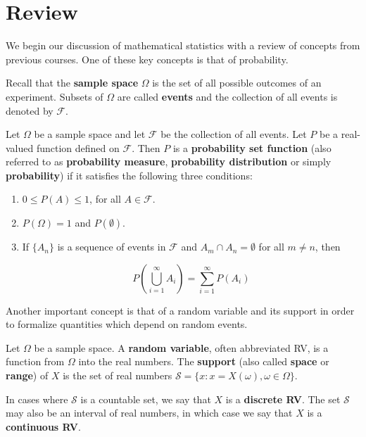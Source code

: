 \section{Review}

We begin our discussion of mathematical statistics with a review of concepts from previous courses. One of these key concepts is that of probability.

Recall that the \textbf{sample space} $\Omega$ is the set of all possible outcomes of an experiment. Subsets of $\Omega$ are called \textbf{events} and the collection of all events is denoted by $\mathcal F$.

\begin{definition}
	Let $\Omega$ be a sample space and let $\mathcal F$ be the collection of all events. Let $P$ be a real-valued function defined on $\mathcal F$. Then $P$ is a \textbf{probability set function} (also referred to as \textbf{probability measure}, \textbf{probability distribution} or simply \textbf{probability}) if it satisfies the following three conditions:
	\begin{enumerate}
		\item $0\leq P(A)\leq 1$, for all $A\in\mathcal F$.
		\item $P(\Omega)=1$ and $P(\emptyset)$.
		\item If $\{A_n\}$ is a sequence of events in $\mathcal F$ and $A_m\cap A_n=\emptyset$ for all $m\neq n$, then

		$$P\left(\bigcup_{i=1}^\infty A_i\right)=\sum_{i=1}^\infty P(A_i)$$
	\end{enumerate}
\end{definition}

Another important concept is that of a random variable and its support in order to formalize quantities which depend on random events.

\begin{definition}
	Let $\Omega$ be a sample space. A \textbf{random variable}, often abbreviated RV, is a function from $\Omega$ into the real numbers. The \textbf{support} (also called \textbf{space} or \textbf{range}) of $X$ is the set of real numbers $\mathcal S=\{x:x=X(\omega),\omega\in \Omega\}$.
\end{definition}

In cases where $\mathcal S$ is a countable set, we say that $X$ is a \textbf{discrete RV}. The set $\mathcal S$ may also be an interval of real numbers, in which case we say that $X$ is a \textbf{continuous RV}.

